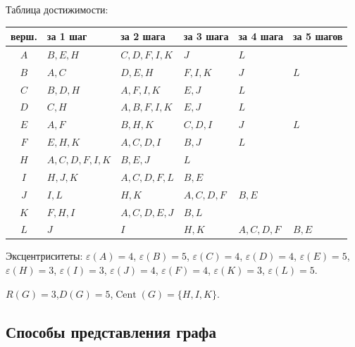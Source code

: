 \medskip
Таблица достижимости:

\begin{tabular}{c|l|l|l|l|l}
  верш. & за 1 шаг & за 2 шага & за 3 шага & за 4 шага & за 5 шагов \\ \hline
  $A$ & $B, E, H$ & $C, D, F, I, K$ & $J$ & $L$ & \\
  $B$ & $A, C$ & $D, E, H$ & $F, I, K$ & $J$ & $L$ \\
  $C$ & $B, D, H$ & $A, F, I, K$ & $E, J$ & $L$ & \\
  $D$ & $C, H$ & $A, B, F, I, K$ & $E, J$ & $L$ & \\
  $E$ & $A, F$ & $B, H, K$ & $C, D, I$ & $J$ & $L$ \\
  $F$ & $E, H, K$ & $A, C, D, I$ & $B, J$ & $L$ & \\
  $H$ & $A, C, D, F, I, K$ & $B, E, J$ & $L$ & & \\
  $I$ & $H, J, K$ & $A, C, D, F, L$ & $B, E$ & & \\
  $J$ & $I, L$ & $H, K$ & $A, C, D, F$ & $B, E$ & \\
  $K$ & $F, H, I$ & $A, C, D, E, J$ & $B, L$ & & \\
  $L$ & $J$ & $I$ & $H, K$ & $A, C, D, F$ & $B, E$ \\
\end{tabular}

\medskip
Эксцентриситеты:
$\varepsilon(A) = 4$,\;
$\varepsilon(B) = 5$,\;
$\varepsilon(C) = 4$,\;
$\varepsilon(D) = 4$,\;
$\varepsilon(E) = 5$,\;
$\varepsilon(H) = 3$,\;
$\varepsilon(I) = 3$,\;
$\varepsilon(J) = 4$,\;
$\varepsilon(F) = 4$,\;
$\varepsilon(K) = 3$,\;
$\varepsilon(L) = 5$.

$R(G) = 3$,\quad $D(G) = 5$,\quad $\operatorname{Cent}(G) = \{H, I, K\}$.

\bigskip
\subsection*{Способы представления графа}

